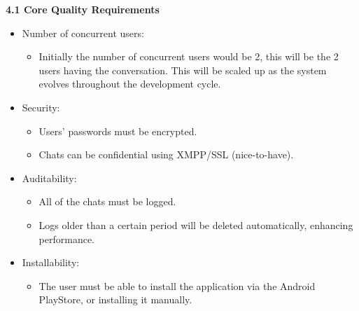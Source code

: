 \documentclass[29pt,a4paper]{moderncv}
\begin{document}
		\noindent \textbf{4.1 Core Quality Requirements}\\
		\begin{itemize}
			\item Number of concurrent users:
			\begin{itemize}
				\item Initially the number of concurrent users would be 2, this will be the 2 users having the conversation. This will be scaled up as the system evolves throughout the development cycle.
			\end{itemize}
			
			\item Security:
			\begin{itemize}
				\item Users’ passwords must be encrypted.
				\item Chats can be confidential using XMPP/SSL (nice-to-have).
			\end{itemize}
			
			\item Auditability:
			\begin{itemize}
				\item All of the chats must be logged.
				\item Logs older than a certain period will be deleted automatically, enhancing performance.
			\end{itemize}
			
			\item Installability:
			\begin{itemize}
				\item The user must be able to install the application via the Android PlayStore, or installing it manually.
			\end{itemize}
		\end{itemize}
		\vspace{4mm}

		\vspace{5mm}
\end{document}
